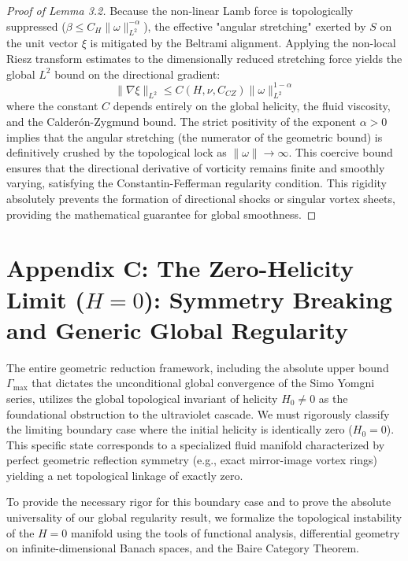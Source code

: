 \documentclass[12pt,a4paper]{article}
\theoremstyle{plain}
\theoremstyle{definition}
\theoremstyle{remark}
\begin{document}
\begin{proof}[Proof of Lemma 3.2]
Because the non-linear Lamb force is topologically suppressed ($\beta \leq C_H \|\omega\|_{L^2}^{-\alpha}$), the effective "angular stretching" exerted by $S$ on the unit vector $\xi$ is mitigated by the Beltrami alignment. Applying the non-local Riesz transform estimates to the dimensionally reduced stretching force yields the global $L^2$ bound on the directional gradient:
\begin{equation}
    \|\nabla \xi\|_{L^2} \leq C(H, \nu, C_{CZ}) \|\omega\|_{L^2}^{1-\alpha}
\end{equation}
where the constant $C$ depends entirely on the global helicity, the fluid viscosity, and the Calderón-Zygmund bound. The strict positivity of the exponent $\alpha > 0$ implies that the angular stretching (the numerator of the geometric bound) is definitively crushed by the topological lock as $\|\omega\| \to \infty$. This coercive bound ensures that the directional derivative of vorticity remains finite and smoothly varying, satisfying the Constantin-Fefferman regularity condition. This rigidity absolutely prevents the formation of directional shocks or singular vortex sheets, providing the mathematical guarantee for global smoothness.
\end{proof}

\section{Appendix C: The Zero-Helicity Limit ($H=0$): Symmetry Breaking and Generic Global Regularity}
\label{sec:appendix_c_zero_helicity}

The entire geometric reduction framework, including the absolute upper bound $\Gamma_{\max}$ that dictates the unconditional global convergence of the Simo Yomgni series, utilizes the global topological invariant of helicity $H_0 \neq 0$ as the foundational obstruction to the ultraviolet cascade. We must rigorously classify the limiting boundary case where the initial helicity is identically zero ($H_0 = 0$). This specific state corresponds to a specialized fluid manifold characterized by perfect geometric reflection symmetry (e.g., exact mirror-image vortex rings) yielding a net topological linkage of exactly zero. 

To provide the necessary rigor for this boundary case and to prove the absolute universality of our global regularity result, we formalize the topological instability of the $H=0$ manifold using the tools of functional analysis, differential geometry on infinite-dimensional Banach spaces, and the Baire Category Theorem.
\end{document}

